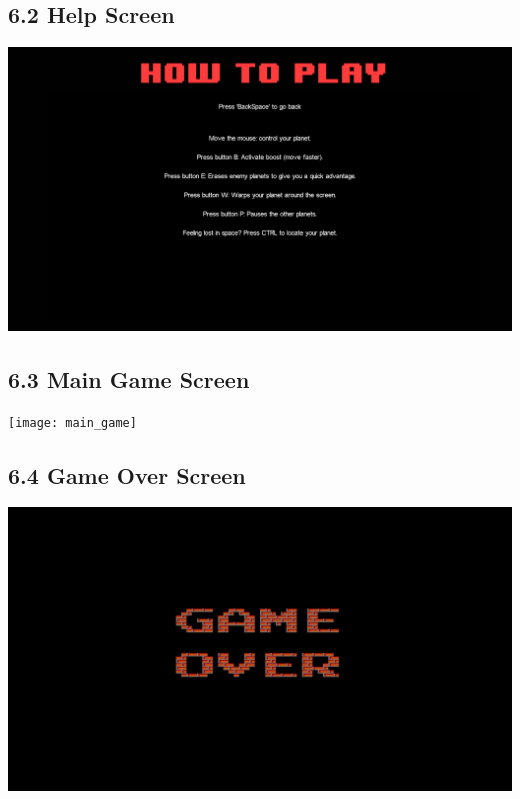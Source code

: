 \documentclass[12pt]{report}
\begin{document}
\subsection*{6.2 Help Screen}
\includegraphics[width=\textwidth]{help_screen}

\subsection*{6.3 Main Game Screen}
\texttt{[image: main\_game]}

\subsection*{6.4 Game Over Screen}
\includegraphics[width=\textwidth]{screen_gameover}
\end{document}
